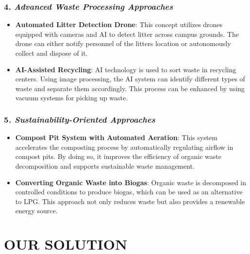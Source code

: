 \documentclass[
]{article}
\begin{document}
\hypertarget{advanced-waste-processing-approaches}{%
\subsubsection{\texorpdfstring{4. \emph{\textbf{Advanced Waste
Processing
Approaches}}}{4. Advanced Waste Processing Approaches}}\label{advanced-waste-processing-approaches}}

\begin{itemize}
\item
  \textbf{Automated Litter Detection Drone}: This concept utilizes
  drones equipped with cameras and AI to detect litter across campus
  grounds. The drone can either notify personnel of the
  litter\textquotesingle s location or autonomously collect and dispose
  of it.
\item
  \textbf{AI-Assisted Recycling}: AI technology is used to sort waste in
  recycling centers. Using image processing, the AI system can identify
  different types of waste and separate them accordingly. This process
  can be enhanced by using vacuum systems for picking up waste.
\end{itemize}

\hypertarget{sustainability-oriented-approaches}{%
\subsubsection{\texorpdfstring{5\emph{. \textbf{Sustainability-Oriented
Approaches}}}{5. Sustainability-Oriented Approaches}}\label{sustainability-oriented-approaches}}

\begin{itemize}
\item
  \textbf{Compost Pit System with Automated Aeration}: This system
  accelerates the composting process by automatically regulating airflow
  in compost pits. By doing so, it improves the efficiency of organic
  waste decomposition and supports sustainable waste management.
\item
  \textbf{Converting Organic Waste into Biogas}: Organic waste is
  decomposed in controlled conditions to produce biogas, which can be
  used as an alternative to LPG. This approach not only reduces waste
  but also provides a renewable energy source.
\end{itemize}

\hypertarget{our-solution}{%
\section{OUR SOLUTION}\label{our-solution}}
\end{document}
